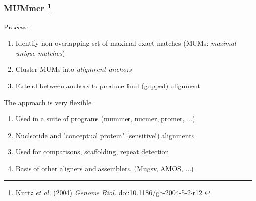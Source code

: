 %
\begin{frame}
  \frametitle{MUMmer
  \footnote{\tiny{\href{http://dx.doi.org/10.1186/gb-2004-5-2-r12
}{Kurtz \textit{et al.} (2004) \textit{Genome Biol.} doi:10.1186/gb-2004-5-2-r12
}}}
  }
  \textcolor{RawSienna}{Process:}
  \begin{enumerate}
    \item \textcolor{hutton_green}{Identify non-overlapping set of maximal exact matches (MUMs: \textit{maximal unique matches})}
    \item \textcolor{hutton_blue}{Cluster MUMs into \textit{alignment anchors}}
    \item \textcolor{hutton_purple}{Extend between anchors to produce final (gapped) alignment}    
  \end{enumerate}
  \textcolor{RawSienna}{The approach is very flexible}
  \begin{enumerate}
    \item Used in a suite of programs (\url{mummer}, \url{nucmer}, \url{promer}, $\ldots$)
    \item Nucleotide and "conceptual protein" (sensitive!) alignments
    \item Used for comparisons, scaffolding, repeat detection
    \item Basis of other aligners and assemblers, (\url{Mugsy}, \url{AMOS}, $\ldots$)
  \end{enumerate}
  
\end{frame}